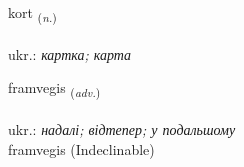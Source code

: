 \documentclass[frontgrid, backgrid]{flacards}\usepackage[]{graphicx}\usepackage[]{xcolor}
\begin{document}
\renewcommand{\blhead}{\vskip5pt {\small\bfseries\footnotesize Nafnorð | іменник }}
\renewcommand{\bcfoot}{\vskip5pt \hspace{2pt}{\small\bfseries\footnotesize 2K}}


{kort \small{\textsubscript{(\textit{n.})}} \\[1ex] %
\textphonetic{[kʰɔr̥t]} \\
ukr.: \emph{картка; карта} \\  [2ex]
\renewcommand*{\arraystretch}{0.8}
}


\renewcommand{\flhead}{\vskip5pt \fboxsep=0pt {\small\bfseries\footnotesize Atviksorð | прислівник}}
\renewcommand{\fcfoot}{\vskip5pt \fboxsep=0pt \hspace{2pt}{\small\bfseries\footnotesize 2K}}

\renewcommand{\blhead}{\vskip5pt {\small\bfseries\footnotesize Atviksorð | прислівник }}
\renewcommand{\bcfoot}{\vskip5pt \hspace{2pt}{\small\bfseries\footnotesize 2K}}


{framvegis \small{\textsubscript{(\textit{adv.})}} \\[1ex]
\textphonetic{[framveijɪs]} \\
ukr.: \emph{надалі; відтепер; у подальшому} \\  [2ex]
framvegis (Indeclinable)}


\renewcommand{\flhead}{\vskip5pt \fboxsep=0pt {\small\bfseries\footnotesize Atviksorð | прислівник}}
\renewcommand{\fcfoot}{\vskip5pt \fboxsep=0pt \hspace{2pt}{\small\bfseries\footnotesize 2K}}
\end{document}
